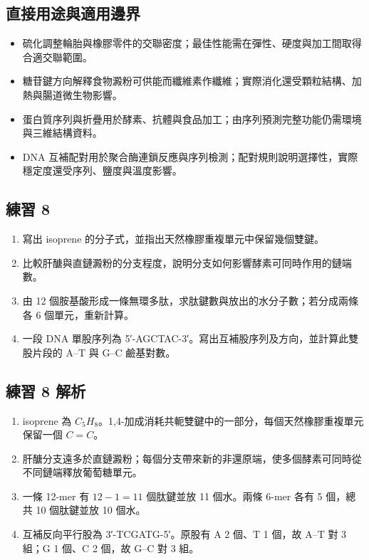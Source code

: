 \documentclass[11pt,a4paper]{article}
\providecommand{\tightlist}{%
  \setlength{\itemsep}{0pt}\setlength{\parskip}{0pt}}
\begin{document}
\subsection{直接用途與適用邊界}\label{ux76f4ux63a5ux7528ux9014ux8207ux9069ux7528ux908aux754c-7}

\begin{itemize}
\tightlist
\item
  硫化調整輪胎與橡膠零件的交聯密度；最佳性能需在彈性、硬度與加工間取得合適交聯範圍。
\item
  糖苷鍵方向解釋食物澱粉可供能而纖維素作纖維；實際消化還受顆粒結構、加熱與腸道微生物影響。
\item
  蛋白質序列與折疊用於酵素、抗體與食品加工；由序列預測完整功能仍需環境與三維結構資料。
\item
  DNA 互補配對用於聚合酶連鎖反應與序列檢測；配對規則說明選擇性，實際穩定度還受序列、鹽度與溫度影響。
\end{itemize}

\subsection{練習 8}\label{ux7df4ux7fd2-8}

\begin{enumerate}
\def\labelenumi{\arabic{enumi}.}
\tightlist
\item
  寫出 isoprene 的分子式，並指出天然橡膠重複單元中保留幾個雙鍵。
\item
  比較肝醣與直鏈澱粉的分支程度，說明分支如何影響酵素可同時作用的鏈端數。
\item
  由 12 個胺基酸形成一條無環多肽，求肽鍵數與放出的水分子數；若分成兩條各 6 個單元，重新計算。
\item
  一段 DNA 單股序列為 5′-AGCTAC-3′。寫出互補股序列及方向，並計算此雙股片段的 A--T 與 G--C 鹼基對數。
\end{enumerate}

\subsection{練習 8 解析}\label{ux7df4ux7fd2-8-ux89e3ux6790}

\begin{enumerate}
\def\labelenumi{\arabic{enumi}.}
\tightlist
\item
  isoprene 為 \(C_5H_8\)。1,4-加成消耗共軛雙鍵中的一部分，每個天然橡膠重複單元保留一個 \(C=C\)。
\item
  肝醣分支遠多於直鏈澱粉；每個分支帶來新的非還原端，使多個酵素可同時從不同鏈端釋放葡萄糖單元。
\item
  一條 12-mer 有 \(12-1=11\) 個肽鍵並放 11 個水。兩條 6-mer 各有 5 個，總共 10 個肽鍵並放 10 個水。
\item
  互補反向平行股為 3′-TCGATG-5′。原股有 A 2 個、T 1 個，故 A--T 對 3 組；G 1 個、C 2 個，故 G--C 對 3 組。
\end{enumerate}
\end{document}

